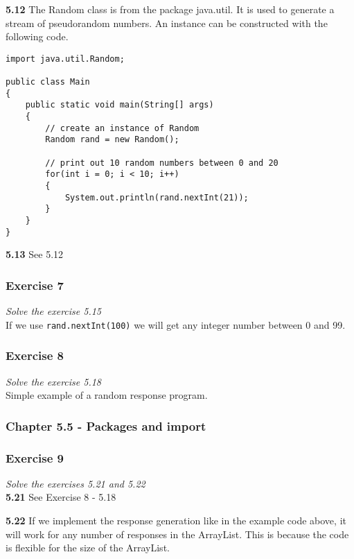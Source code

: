 \textbf{5.12} The Random class is from the package java.util. It is used to
generate a stream of pseudorandom numbers. An instance can be constructed
with the following code.

\begin{lstlisting}
import java.util.Random;

public class Main
{
	public static void main(String[] args)
	{
		// create an instance of Random
		Random rand = new Random();

		// print out 10 random numbers between 0 and 20
		for(int i = 0; i < 10; i++)
		{
			System.out.println(rand.nextInt(21));
		}
	}
}
\end{lstlisting}

\textbf{5.13} See 5.12

\subsubsection*{Exercise 7}
\textit{Solve the exercise 5.15}\\

If we use \lstinline{rand.nextInt(100)} we will get any integer number 
between 0 and 99.

\subsubsection*{Exercise 8}
\textit{Solve the exercise 5.18}\\

Simple example of a random response program.



\subsubsection{Chapter 5.5 - Packages and import}

\subsubsection*{Exercise 9}
\textit{Solve the exercises 5.21 and 5.22}\\

\textbf{5.21} See Exercise 8 - 5.18

\textbf{5.22} If we implement the response generation like in the example code 
above, it will work for any number of responses in the ArrayList. This is 
because the code is flexible for the size of the ArrayList.


